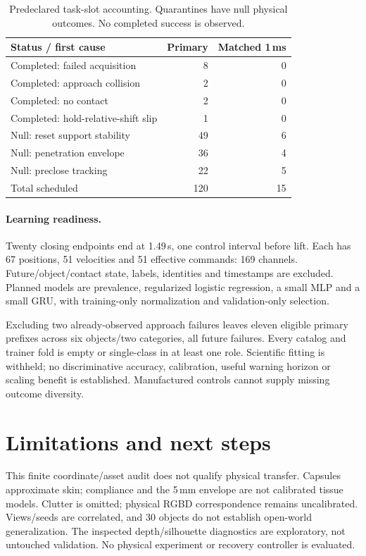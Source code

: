 \begin{table}[t]
\centering
\caption{Predeclared task-slot accounting. Quarantines have null physical outcomes. No completed success is observed.}
\label{tab:outcomes}
\begin{tabular}{lrr}\toprule
Status / first cause & Primary & Matched 1\,ms\\\midrule
Completed: failed acquisition & 8 & 0\\
Completed: approach collision & 2 & 0\\
Completed: no contact & 2 & 0\\
Completed: hold-relative-shift slip & 1 & 0\\\midrule
Null: reset support stability & 49 & 6\\
Null: penetration envelope & 36 & 4\\
Null: preclose tracking & 22 & 5\\\midrule
Total scheduled & 120 & 15\\\bottomrule
\end{tabular}
\end{table}

\paragraph{Learning readiness.}
Twenty closing endpoints end at 1.49\,s, one control interval before lift. Each has 67 positions, 51 velocities and 51 effective commands: 169 channels. Future/object/contact state, labels, identities and timestamps are excluded. Planned models are prevalence, regularized logistic regression, a small MLP and a small GRU, with training-only normalization and validation-only selection.

Excluding two already-observed approach failures leaves eleven eligible primary prefixes across six objects/two categories, all future failures. Every catalog and trainer fold is empty or single-class in at least one role. Scientific fitting is withheld; no discriminative accuracy, calibration, useful warning horizon or scaling benefit is established. Manufactured controls cannot supply missing outcome diversity.

\section{Limitations and next steps}
This finite coordinate/asset audit does not qualify physical transfer. Capsules approximate skin; compliance and the 5\,mm envelope are not calibrated tissue models. Clutter is omitted; physical RGBD correspondence remains uncalibrated. Views/seeds are correlated, and 30 objects do not establish open-world generalization. The inspected depth/silhouette diagnostics are exploratory, not untouched validation. No physical experiment or recovery controller is evaluated.

